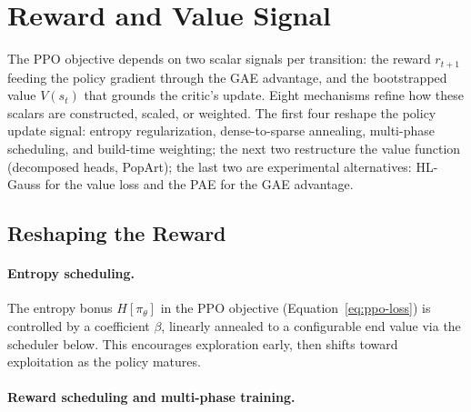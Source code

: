 \vspace*{-0.6cm}

\section{Reward and Value Signal}
\label{sec:reward-signal}
The PPO objective depends on two scalar signals per transition: the reward $r_{t+1}$ feeding the policy gradient through the GAE advantage, and the bootstrapped value $V(s_t)$ that grounds the critic's update. Eight mechanisms refine how these scalars are constructed, scaled, or weighted. The first four reshape the policy update signal: entropy regularization, dense-to-sparse annealing, multi-phase scheduling, and build-time weighting; the next two restructure the value function (decomposed heads, PopArt); the last two are experimental alternatives: HL-Gauss for the value loss and the PAE for the GAE advantage.

\vspace{-0.2cm}

\subsection*{Reshaping the Reward}

\paragraph{Entropy scheduling.}

The entropy bonus $H[\pi_\theta]$ in the PPO objective (Equation~\ref{eq:ppo-loss}) is controlled by a coefficient $\beta$, linearly annealed to a configurable end value via the scheduler below. This encourages exploration early, then shifts toward exploitation as the policy matures.

\paragraph{Reward scheduling and multi-phase training.}

